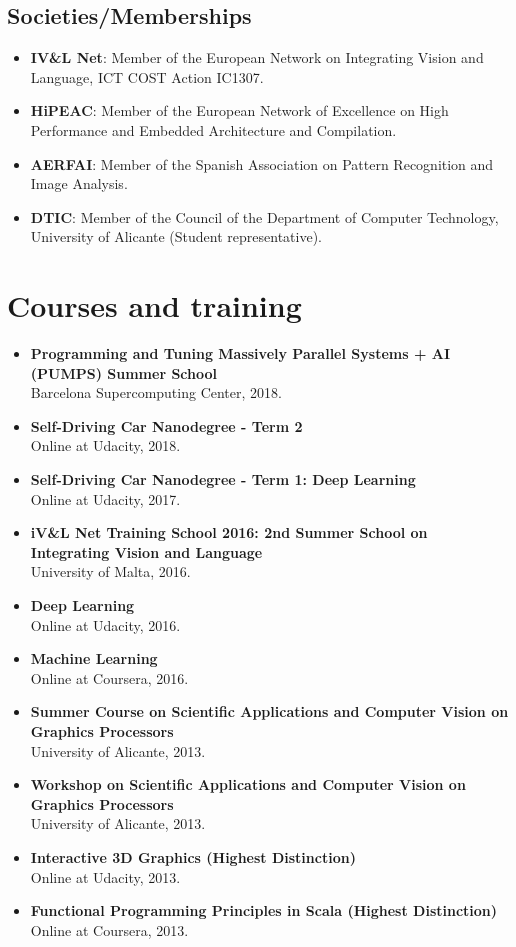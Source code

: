 \documentclass[8pt]{article}
\begin{document}
\subsection*{Societies/Memberships}

\begin{itemize}
	\item \textbf{IV\&L Net}: Member of the European Network on Integrating Vision and Language, ICT COST Action IC1307.
	\item \textbf{HiPEAC}: Member of the European Network of Excellence on High Performance and Embedded Architecture and Compilation.
	\item \textbf{AERFAI}: Member of the Spanish Association on Pattern Recognition and Image Analysis.
	\item \textbf{DTIC}: Member of the Council of the Department of Computer Technology, University of Alicante (Student representative).
\end{itemize}


\section*{Courses and training}

\begin{itemize}
	\item \textbf{Programming and Tuning Massively Parallel Systems + AI (PUMPS) Summer School}\\ Barcelona Supercomputing Center, 2018.
	\item \textbf{Self-Driving Car Nanodegree - Term 2}\\ Online at Udacity, 2018.
	\item \textbf{Self-Driving Car Nanodegree - Term 1: Deep Learning}\\ Online at Udacity, 2017.
	\item \textbf{iV\&L Net Training School 2016: 2nd Summer School on Integrating Vision and Language}\\ University of Malta, 2016.
	\item \textbf{Deep Learning}\\ Online at Udacity, 2016.
	\item \textbf{Machine Learning}\\ Online at Coursera, 2016.
	\item \textbf{Summer Course on Scientific Applications and Computer Vision on Graphics Processors}\\ University of Alicante, 2013.
	\item \textbf{Workshop on Scientific Applications and Computer Vision on Graphics Processors}\\ University of Alicante, 2013.	
	\item \textbf{Interactive 3D Graphics (Highest Distinction)}\\
	Online at Udacity, 2013.
	\item \textbf{Functional Programming Principles in Scala (Highest Distinction)}\\
	Online at Coursera, 2013.
\end{itemize}
\end{document}

